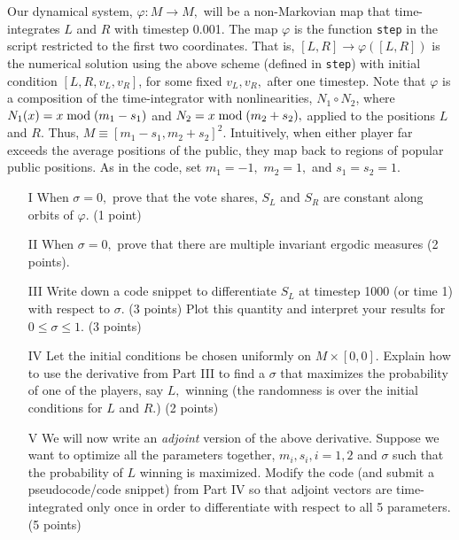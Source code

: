 \documentclass[12pt]{article}
\begin{document}
Our dynamical system, $\varphi: M \to M,$ will be a non-Markovian map that time-integrates $L$ and $R$ with timestep 0.001. The map $\varphi$ is the function \verb+step+ in the script restricted to the first two coordinates.
That is, $[L,R] \to \varphi([L, R])$ is the numerical solution using the above scheme (defined in \verb+step+) with initial condition $[L, R, v_L, v_R]$, for some fixed $v_L, v_R,$ after one timestep. 
Note that $\varphi$ is a composition of the time-integrator with nonlinearities, $N_1 \circ N_2$, where $N_1(x) = x \;{\rm mod}\; (m_1 - s_1)$ and $N_2 = x \;{\rm mod}\; (m_2 + s_2),$ applied to the positions 
$L$ and $R.$ Thus, $M \equiv [m_1-s_1, m_2+s_2]^2.$ Intuitively, when either player far exceeds the average positions of the public, they map back to regions of popular public positions.
As in the code, set $m_1=-1,$ $m_2=1,$ and $s_1 = s_2 = 1.$
\begin{enumerate}
	\item[I] When $\sigma =0,$ prove that the vote shares, $S_L$ and $S_R$ are constant along orbits of $\varphi.$
	 (1 point) 
	\item[II] When $\sigma = 0,$ prove that there are multiple invariant ergodic measures (2 points).
	\item[III] Write down a code snippet to differentiate $S_L$ at timestep 1000 (or time 1) with respect to $\sigma.$ (3 points) Plot this quantity and interpret your results for $0 \leq \sigma \leq 1.$ (3 points)
	\item[IV] Let the initial conditions be chosen uniformly on $M \times [0,0].$ Explain how to use the derivative from Part III to find a $\sigma$ that maximizes the probability of one of the players, say $L,$ winning (the randomness is over the initial conditions for $L$ and $R.$) (2 points)
	\item[V] We will now write an \emph{adjoint} version of the above derivative. Suppose we want to optimize all the parameters together, $m_i, s_i, i = 1,2$ and $\sigma$ such that 
	the probability of $L$ winning is maximized. Modify the code (and submit a pseudocode/code snippet) from Part IV so that adjoint vectors are time-integrated only once in order to differentiate with respect to all 5 parameters. (5 points)  
\end{enumerate} 
\end{document}
